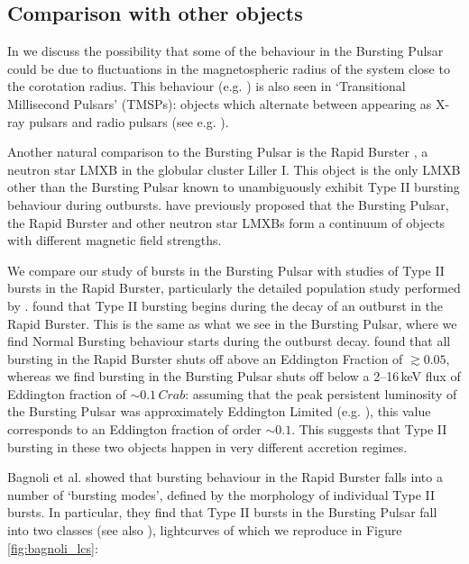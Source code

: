 \subsection{Comparison with other objects}

\par In \citet{Court_BPTMSP} we discuss the possibility that some of the behaviour in the Bursting Pulsar could be due to fluctuations in the magnetospheric radius of the system close to the corotation radius.  This behaviour (e.g. \citealp{Bogdanov_TMSPVar,Ferrigno_TMSPVar}) is also seen in `Transitional Millisecond Pulsars' (TMSPs): objects which alternate between appearing as X-ray pulsars and radio pulsars (see e.g. \citealp{Archibald_Link,Papitto_Swings}).
\par Another natural comparison to the Bursting Pulsar is the Rapid Burster \citep{Lewin_RBDiscovery}, a neutron star LMXB in the globular cluster Liller I.  This object is the only LMXB other than the Bursting Pulsar known to unambiguously exhibit Type II bursting behaviour during outbursts.  \citet{Rappaport_BPHistory} have previously proposed that the Bursting Pulsar, the Rapid Burster and other neutron star LMXBs form a continuum of objects with different magnetic field strengths.
\par We compare our study of bursts in the Bursting Pulsar with studies of Type II bursts in the Rapid Burster, particularly the detailed population study performed by \citet{Bagnoli_PopStudy}.  \citet{Bagnoli_PopStudy} found that Type II bursting begins during the decay of an outburst in the Rapid Burster.  This is the same as what we see in the Bursting Pulsar, where we find Normal Bursting behaviour starts during the outburst decay.  \citet{Bagnoli_PopStudy} found that all bursting in the Rapid Burster shuts off above an Eddington Fraction of $\gtrsim0.05$, whereas we find bursting in the Bursting Pulsar shuts off below a 2--16\,keV flux of Eddington fraction of $\sim0.1\,Crab$: assuming that the peak persistent luminosity of the Bursting Pulsar was approximately Eddington Limited (e.g. \citealp{Sazonov_BPGranat}), this value corresponds to an Eddington fraction of order $\sim0.1$.  This suggests that Type II bursting in these two objects happen in very different accretion regimes.
\par Bagnoli et al. showed that bursting behaviour in the Rapid Burster falls into a number of `bursting modes', defined by the morphology of individual Type II bursts.  In particular, they find that Type II bursts in the Bursting Pulsar fall into two classes (see also \citealp{Marshall_2types}), lightcurves of which we reproduce in Figure \ref{fig:bagnoli_lcs}:

